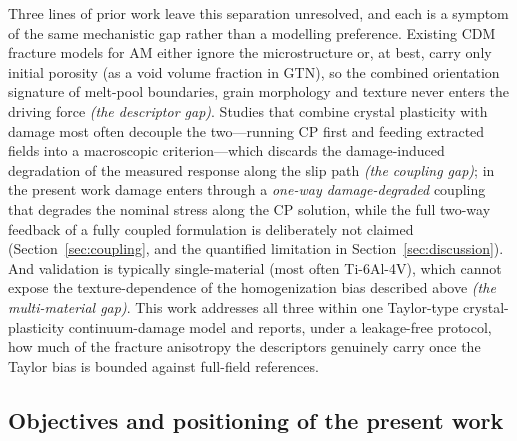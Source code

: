 \documentclass[12pt,a4paper,twocolumn]{article}
\begin{document}
Three lines of prior work leave this separation unresolved, and each is a symptom of the same mechanistic gap rather than a modelling preference. Existing CDM fracture models for AM either ignore the microstructure or, at best, carry only initial porosity (as a void volume fraction in GTN), so the combined orientation signature of melt-pool boundaries, grain morphology and texture never enters the driving force \emph{(the descriptor gap)}. Studies that combine crystal plasticity with damage most often decouple the two---running CP first and feeding extracted fields into a macroscopic criterion---which discards the damage-induced degradation of the measured response along the slip path \emph{(the coupling gap)}; in the present work damage enters through a \emph{one-way damage-degraded} coupling that degrades the nominal stress along the CP solution, while the full two-way feedback of a fully coupled formulation is deliberately not claimed (Section~\ref{sec:coupling}, and the quantified limitation in Section~\ref{sec:discussion}). And validation is typically single-material (most often Ti-6Al-4V), which cannot expose the texture-dependence of the homogenization bias described above \emph{(the multi-material gap)}. This work addresses all three within one Taylor-type crystal-plasticity continuum-damage model and reports, under a leakage-free protocol, how much of the fracture anisotropy the descriptors genuinely carry once the Taylor bias is bounded against full-field references.

\subsection{Objectives and positioning of the present work}
\end{document}
